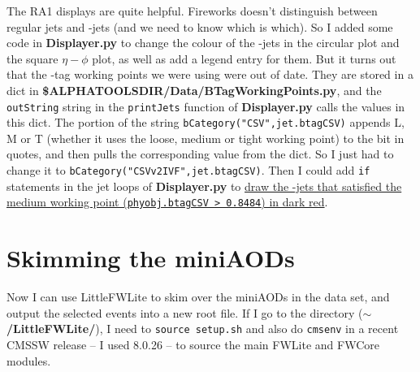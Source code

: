 The RA1 displays are quite helpful. Fireworks doesn't distinguish between regular jets and \Pqb-jets (and we need to know which is which). So I added some code in \textbf{Displayer.py} to change the colour of the \Pqb-jets in the circular plot and the square $\eta-\phi$ plot, as well as add a legend entry for them. But it turns out that the \Pqb-tag working points we were using were out of date. They are stored in a dict in \textbf{\$ALPHATOOLSDIR/Data/BTagWorkingPoints.py}, and the \texttt{outString} string in the \texttt{printJets} function of \textbf{Displayer.py} calls the values in this dict. The portion of the string \texttt{bCategory("CSV",jet.btagCSV)} appends L, M or T (whether it uses the loose, medium or tight working point) to the bit in quotes, and then pulls the corresponding value from the dict. So I just had to change it to \texttt{bCategory("CSVv2IVF",jet.btagCSV)}. Then I could add \texttt{if} statements in the jet loops of \textbf{Displayer.py} to \uline{draw the \Pqb-jets that satisfied the medium working point (\texttt{phyobj.btagCSV > 0.8484}) in dark red}.


\section{Skimming the miniAODs}

Now I can use LittleFWLite to skim over the miniAODs in the data set, and output the selected events into a new root file. If I go to the directory (\textbf{$\sim$/LittleFWLite/}), I need to \texttt{source setup.sh} and also do \texttt{cmsenv} in a recent CMSSW release -- I used 8.0.26 -- to source the main FWLite and FWCore modules.



